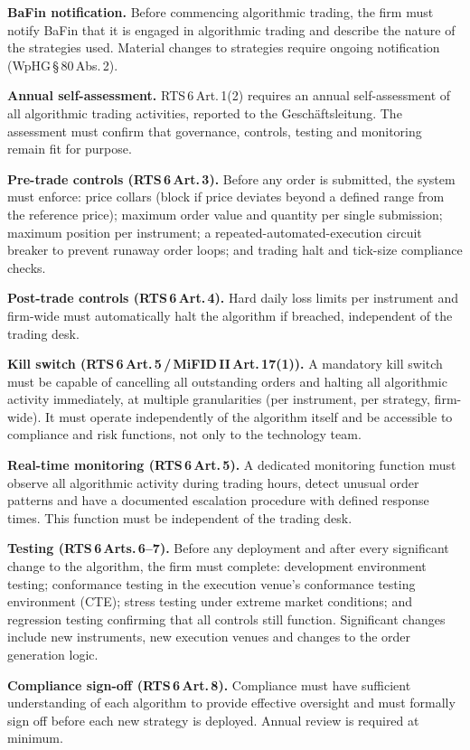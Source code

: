 \documentclass[12pt,a4paper]{report}
\begin{document}
\textbf{BaFin notification.} Before commencing algorithmic trading, the firm must notify
BaFin that it is engaged in algorithmic trading and describe the nature of the strategies
used. Material changes to strategies require ongoing notification
(WpHG\,\S\,80\,Abs.\,2).

\textbf{Annual self-assessment.} RTS\,6\,Art.\,1(2) requires an annual self-assessment
of all algorithmic trading activities, reported to the Gesch{\"a}ftsleitung. The
assessment must confirm that governance, controls, testing and monitoring remain fit for
purpose.

\textbf{Pre-trade controls (RTS\,6\,Art.\,3).} Before any order is submitted, the
system must enforce: price collars (block if price deviates beyond a defined range from
the reference price); maximum order value and quantity per single submission; maximum
position per instrument; a repeated-automated-execution circuit breaker to prevent
runaway order loops; and trading halt and tick-size compliance checks.

\textbf{Post-trade controls (RTS\,6\,Art.\,4).} Hard daily loss limits per instrument
and firm-wide must automatically halt the algorithm if breached, independent of the
trading desk.

\textbf{Kill switch (RTS\,6\,Art.\,5\,/\,MiFID\,II\,Art.\,17(1)).} A mandatory
kill switch must be capable of cancelling all outstanding orders and halting all
algorithmic activity immediately, at multiple granularities (per instrument, per
strategy, firm-wide). It must operate independently of the algorithm itself and be
accessible to compliance and risk functions, not only to the technology team.

\textbf{Real-time monitoring (RTS\,6\,Art.\,5).} A dedicated monitoring function must
observe all algorithmic activity during trading hours, detect unusual order patterns
and have a documented escalation procedure with defined response times. This function
must be independent of the trading desk.

\textbf{Testing (RTS\,6\,Arts.\,6--7).} Before any deployment and after every
significant change to the algorithm, the firm must complete: development environment
testing; conformance testing in the execution venue's conformance testing environment
(CTE); stress testing under extreme market conditions; and regression testing
confirming that all controls still function. Significant changes include new instruments,
new execution venues and changes to the order generation logic.

\textbf{Compliance sign-off (RTS\,6\,Art.\,8).} Compliance must have sufficient
understanding of each algorithm to provide effective oversight and must formally sign
off before each new strategy is deployed. Annual review is required at minimum.
\end{document}
